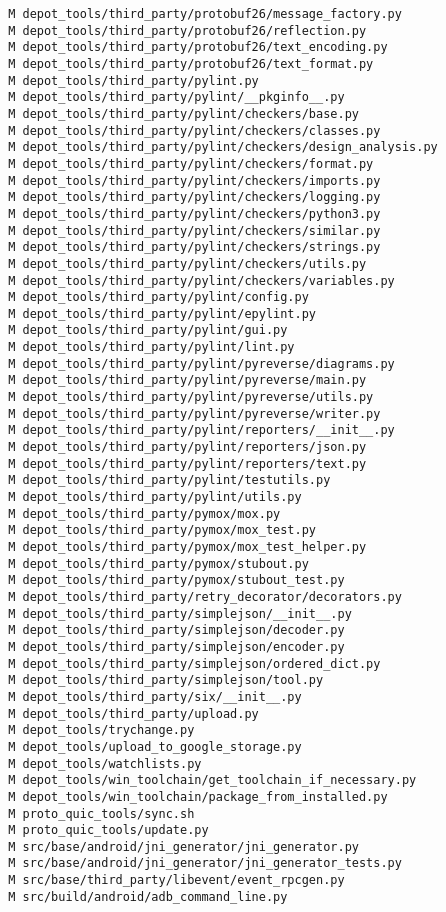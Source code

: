 \documentclass{article}
\begin{document}
\begin{verbatim}
 M depot_tools/third_party/protobuf26/message_factory.py
 M depot_tools/third_party/protobuf26/reflection.py
 M depot_tools/third_party/protobuf26/text_encoding.py
 M depot_tools/third_party/protobuf26/text_format.py
 M depot_tools/third_party/pylint.py
 M depot_tools/third_party/pylint/__pkginfo__.py
 M depot_tools/third_party/pylint/checkers/base.py
 M depot_tools/third_party/pylint/checkers/classes.py
 M depot_tools/third_party/pylint/checkers/design_analysis.py
 M depot_tools/third_party/pylint/checkers/format.py
 M depot_tools/third_party/pylint/checkers/imports.py
 M depot_tools/third_party/pylint/checkers/logging.py
 M depot_tools/third_party/pylint/checkers/python3.py
 M depot_tools/third_party/pylint/checkers/similar.py
 M depot_tools/third_party/pylint/checkers/strings.py
 M depot_tools/third_party/pylint/checkers/utils.py
 M depot_tools/third_party/pylint/checkers/variables.py
 M depot_tools/third_party/pylint/config.py
 M depot_tools/third_party/pylint/epylint.py
 M depot_tools/third_party/pylint/gui.py
 M depot_tools/third_party/pylint/lint.py
 M depot_tools/third_party/pylint/pyreverse/diagrams.py
 M depot_tools/third_party/pylint/pyreverse/main.py
 M depot_tools/third_party/pylint/pyreverse/utils.py
 M depot_tools/third_party/pylint/pyreverse/writer.py
 M depot_tools/third_party/pylint/reporters/__init__.py
 M depot_tools/third_party/pylint/reporters/json.py
 M depot_tools/third_party/pylint/reporters/text.py
 M depot_tools/third_party/pylint/testutils.py
 M depot_tools/third_party/pylint/utils.py
 M depot_tools/third_party/pymox/mox.py
 M depot_tools/third_party/pymox/mox_test.py
 M depot_tools/third_party/pymox/mox_test_helper.py
 M depot_tools/third_party/pymox/stubout.py
 M depot_tools/third_party/pymox/stubout_test.py
 M depot_tools/third_party/retry_decorator/decorators.py
 M depot_tools/third_party/simplejson/__init__.py
 M depot_tools/third_party/simplejson/decoder.py
 M depot_tools/third_party/simplejson/encoder.py
 M depot_tools/third_party/simplejson/ordered_dict.py
 M depot_tools/third_party/simplejson/tool.py
 M depot_tools/third_party/six/__init__.py
 M depot_tools/third_party/upload.py
 M depot_tools/trychange.py
 M depot_tools/upload_to_google_storage.py
 M depot_tools/watchlists.py
 M depot_tools/win_toolchain/get_toolchain_if_necessary.py
 M depot_tools/win_toolchain/package_from_installed.py
 M proto_quic_tools/sync.sh
 M proto_quic_tools/update.py
 M src/base/android/jni_generator/jni_generator.py
 M src/base/android/jni_generator/jni_generator_tests.py
 M src/base/third_party/libevent/event_rpcgen.py
 M src/build/android/adb_command_line.py

\end{verbatim}
\end{document}
